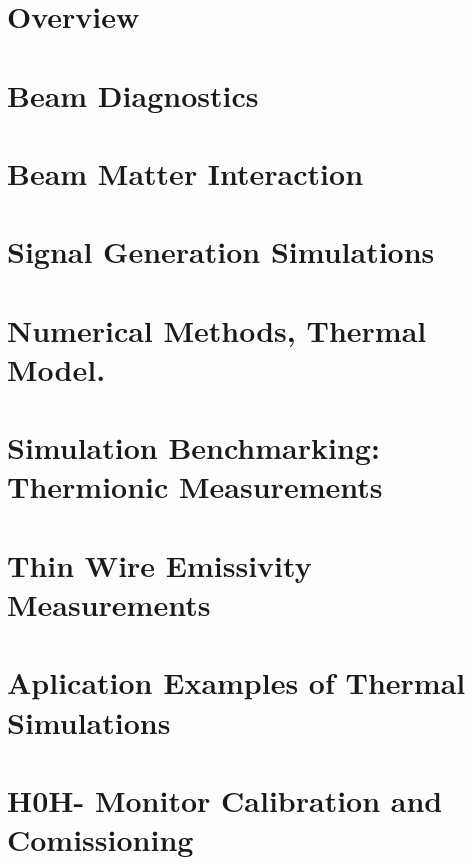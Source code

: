 \documentclass[12pt,twoside,openright]{report}
\begin{document}


\pagestyle{plain}




\chapter{Overview} 
\label{ch:Overview}


\chapter{Beam Diagnostics}

\label{ch:BeamInstrumentation}

\chapter{Beam Matter Interaction} 
\label{ch:BeamMatterInter}


\chapter{Signal Generation Simulations} 
\label{ch:CurrentModeling}


\chapter{Numerical Methods, Thermal Model.}
\label{ch:TempModeling}


\chapter{Simulation Benchmarking: Thermionic Measurements}
\label{ch:ThermoMeasur}


\chapter{Thin Wire Emissivity Measurements}
\label{ch:EmissivityMeas}


\chapter{Aplication Examples of Thermal Simulations}
\label{ch:ThermModelExamples}


\chapter{H0H- Monitor Calibration and Comissioning}
\label{ch:H0Hm}





\printbibliography 
\end{document}
